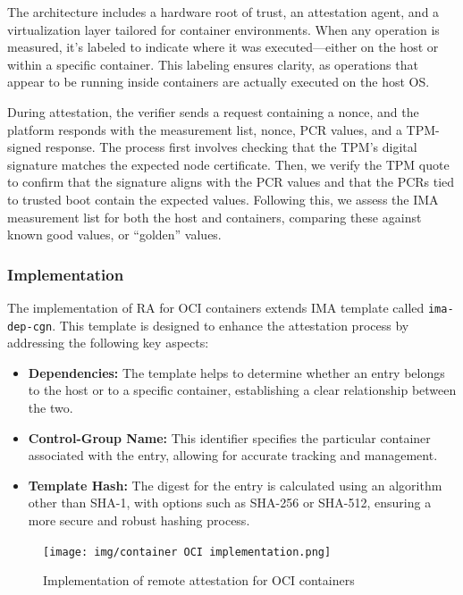 The architecture includes a hardware root of trust, an attestation
agent, and a virtualization layer tailored for container environments.
When any operation is measured, it’s labeled to indicate where it was
executed—either on the host or within a specific container. This
labeling ensures clarity, as operations that appear to be running
inside containers are actually executed on the host OS.

During attestation, the verifier sends a request containing a nonce,
and the platform responds with the measurement list, nonce, PCR
values, and a TPM-signed response. The process first involves checking
that the TPM’s digital signature matches the expected node
certificate. Then, we verify the TPM quote to confirm that the
signature aligns with the PCR values and that the PCRs tied to trusted
boot contain the expected values. Following this, we assess the IMA
measurement list for both the host and containers, comparing these
against known good values, or “golden” values.

\subsubsection{Implementation}

The implementation of RA for OCI containers extends IMA template
called \texttt{ima-dep-cgn}.
This template is designed to enhance the attestation process by
addressing the following key aspects:

\begin{itemize}
    \item \textbf{Dependencies:} The template helps to determine
      whether an entry belongs to the host or to a specific container,
      establishing a clear relationship between the two.
    \item \textbf{Control-Group Name:} This identifier specifies the
      particular container associated with the entry, allowing for
      accurate tracking and management.
    \item \textbf{Template Hash:} The digest for the entry is
      calculated using an algorithm other than SHA-1, with options
      such as SHA-256 or SHA-512, ensuring a more secure and robust
      hashing process.
\end{itemize}

\begin{figure}[H]
  \centering
  \texttt{[image: img/container OCI
  implementation.png]}
  \caption{Implementation of remote attestation for OCI containers}
\end{figure}

